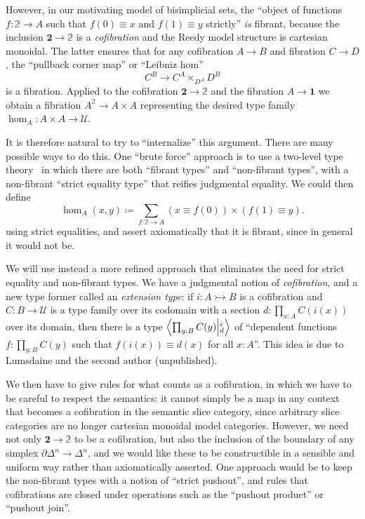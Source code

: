 \documentclass[12pt]{amsart}
\theoremstyle{plain}
\theoremstyle{definition}
\theoremstyle{remark}
\numberwithin{equation}{section}
\newcommand{\exten}[4]{\left\langle\mathchoice{\textstyle\prod_{#1}}{\textstyle\prod_{#1}}{\scriptstyle\prod_{#1}}{\scriptscriptstyle\prod_{#1}} #2 \middle|^{#3}_{#4}\right\rangle}
\newcommand{\jdeq}{\equiv}
\newcommand{\defeq}{\coloneqq}
\newcommand{\unittype}{\ensuremath{\mathbf{1}}}
\newcommand{\booltype}{\ensuremath{\mathbf{2}}}
\newcommand{\univtype}{\mathcal{U}}
\newcommand{\two}{\mathbb{2}}
\begin{document}
However, in our motivating model of bisimplicial sets, the ``object of functions $f:\two\to A$ such that $f(0)\jdeq x$ and $f(1)\jdeq y$ strictly'' \emph{is} fibrant, because the inclusion $\booltype\to\two$ is a \emph{cofibration} and the Reedy model structure is cartesian monoidal.
The latter ensures that for any cofibration $A\to B$ and fibration $C\to D$, the ``pullback corner map'' or ``Leibniz hom''
\[ C^B \to C^A \times_{D^A} D^B \]
is a fibration.
Applied to the cofibration $\booltype\to \two$ and the fibration $A\to \unittype$ we obtain a fibration $A^\two \to A\times A$ representing the desired type family $\hom_A : A\times A \to \univtype$.

It is therefore natural to try to ``internalize'' this argument.
There are many possible ways to do this.
One ``brute force'' approach is to use a two-level type theory~\cite{hts,ack:two-level} in which there are both ``fibrant types'' and ``non-fibrant types'', with a non-fibrant ``strict equality type'' that reifies judgmental equality.
We could then define
\[ \hom_A(x,y) \defeq \sum_{f:\two\to A} (x\jdeq f(0)) \times (f(1)\jdeq y). \]
using strict equalities, and assert axiomatically that it is fibrant, since in general it would not be.

We will use instead a more refined approach that eliminates the need for strict equality and non-fibrant types.
We have a judgmental notion of \emph{cofibration}, and a new type former called an \emph{extension type}: if $i:A\rightarrowtail B$ is a cofibration and $C:B\to\univtype$ is a type family over its codomain with a section $d:\prod_{x:A} C(i(x))$ over its domain, then there is a type $\exten{y:B}{C(y)}{i}{d}$ of ``dependent functions $f:\prod_{y:B} C(y)$ such that $f(i(x))\jdeq d(x)$ for all $x:A$''.
This idea is due to Lumsdaine and the second author (unpublished).

We then have to give rules for what counts as a cofibration, in which we have to be careful to respect the semantics: it cannot simply be a map in any context that becomes a cofibration in the semantic slice category, since arbitrary slice categories are no longer cartesian monoidal model categories.
However, we need not only $\booltype\to\two$ to be a cofibration, but also the inclusion of the boundary of any simplex $\partial \Delta^n \to \Delta^n$, and we would like these to be constructible in a sensible and uniform way rather than axiomatically asserted.
One approach would be to keep the non-fibrant types with a notion of ``strict pushout'', and rules that cofibrations are closed under operations such as the ``pushout product'' or ``pushout join''.
\end{document}
